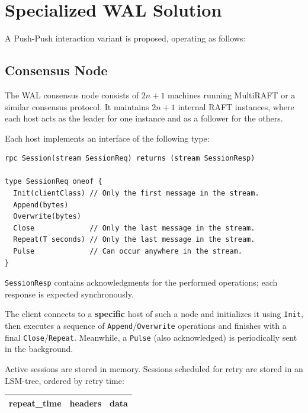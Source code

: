 \documentclass[a4paper,12pt]{article}
\begin{document}
    \section{Specialized WAL Solution}

    A Push-Push interaction variant is proposed, operating as follows:

    \subsection{Consensus Node}

    The WAL consensus node consists of $2n + 1$ machines running MultiRAFT or a similar consensus protocol. It maintains $2n + 1$ internal RAFT instances, where each host acts as the leader for one instance and as a follower for the others.

    Each host implements an interface of the following type:

    \begin{lstlisting}
rpc Session(stream SessionReq) returns (stream SessionResp)

type SessionReq oneof {
  Init(clientClass) // Only the first message in the stream.
  Append(bytes)
  Overwrite(bytes)
  Close             // Only the last message in the stream.
  Repeat(T seconds) // Only the last message in the stream.
  Pulse             // Can occur anywhere in the stream.
}
    \end{lstlisting}

    \texttt{SessionResp} contains acknowledgments for the performed operations; each response is expected synchronously.

    The client connects to a \textbf{specific} host of such a node and initializes it using \texttt{Init}, then executes a sequence of \texttt{Append}/\texttt{Overwrite} operations and finishes with a final \texttt{Close}/\texttt{Repeat}. Meanwhile, a \texttt{Pulse} (also acknowledged) is periodically sent in the background.

    Active sessions are stored in memory. Sessions scheduled for retry are stored in an LSM-tree, ordered by retry time:

    \begin{center}
        \begin{tabular}{|l|c|r|}
            \hline
            repeat\_time & headers & data \\
            \hline
        \end{tabular}
    \end{center}
\end{document}
